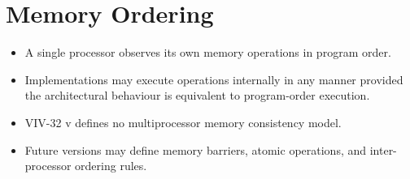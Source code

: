 \section{Memory Ordering}

\begin{itemize}
\item A single processor observes its own memory operations in program order.
\item Implementations may execute operations internally in any manner provided the architectural
behaviour is equivalent to program-order execution.
\item VIV-32 v\version{} defines no multiprocessor memory consistency model.
\item Future versions may define memory barriers, atomic operations, and inter-processor
ordering rules.
\end{itemize}
